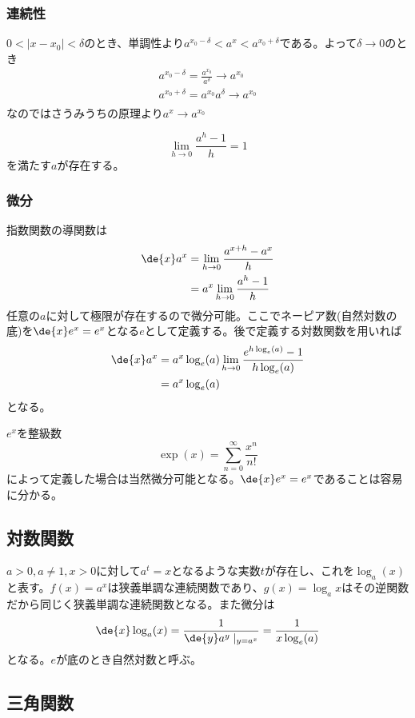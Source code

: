 \subsubsection{連続性}
	$0 < |x - x_0| < \delta$のとき、単調性より$a^{x_0 - \delta} < a^x < a^{x_0 + \delta}$である。よって$\delta \to 0$のとき
	\begin{gather*}
		a^{x_0 - \delta} = \frac{a^{x_0}}{a^\delta} \to a^{x_0}\\
		a^{x_0 + \delta} = a^{x_0}a^\delta \to a^{x_0}\\
	\end{gather*}
	なのではさうみうちの原理より$a^x \to a^{x_0}$

\begin{prop}
		\[\lim_{h \to 0} \frac{a^h - 1}{h} = 1\]
	を満たす$a$が存在する。
\end{prop}
\subsubsection{微分}
指数関数の導関数は
\begin{align*}
	\de{x}a^x
	&= \lim_{h \to 0} \frac{a^{x + h} - a^x}{h}\\
	&= a^x\lim_{h \to 0} \frac{a^h - 1}{h}\\
\end{align*}
任意の$a$に対して極限が存在するので微分可能。ここでネーピア数(自然対数の底)を$\de{x}e^x = e^x$となる$e$として定義する。後で定義する対数関数を用いれば
\begin{align*}
	\de{x}a^x
	&= a^x\log_e(a)\lim_{h \to 0} \frac{e^{h\log_e(a)} - 1}{h\log_e(a)}\\
	&= a^x\log_e(a)\\
\end{align*}
となる。

$e^x$を整級数
	\[\exp(x) = \sum_{n = 0}^\infty \frac{x^n}{n!}\]
によって定義した場合は当然微分可能となる。$\de{x}e^x = e^x$であることは容易に分かる。

\subsection{対数関数}
$a > 0, a \neq 1, x > 0$に対して$a^t = x$となるような実数$t$が存在し、これを$\log_a(x)$と表す。$f(x) = a^x$は狭義単調な連続関数であり、$g(x) = \log_a x$はその逆関数だから同じく狭義単調な連続関数となる。また微分は
	\[\de{x}\log_a(x) = \frac{1}{\de{y}a^y \mid_{y = a^x}} = \frac{1}{x\log_e(a)}\]
となる。$e$が底のとき自然対数と呼ぶ。

\subsection{三角関数}

